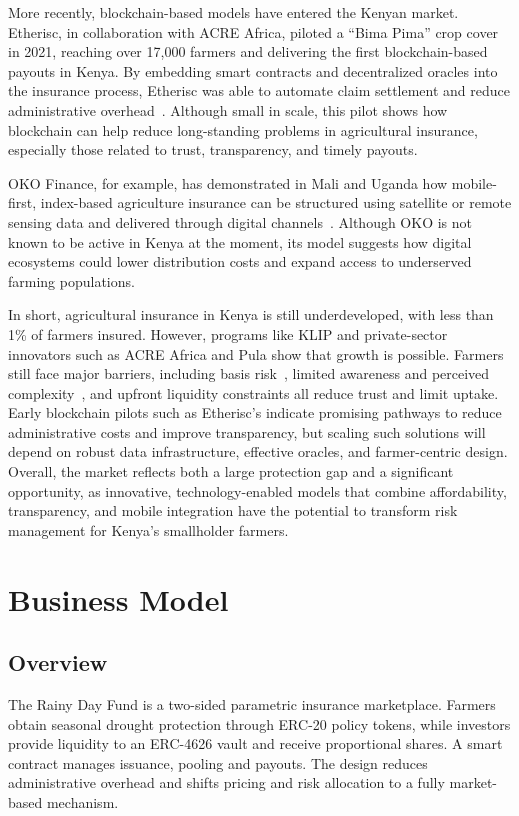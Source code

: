 \documentclass[11pt,a4paper]{article}
\begin{document}
		More recently, blockchain-based models have entered the Kenyan market.
		Etherisc, in collaboration with ACRE Africa, piloted a \enquote{Bima Pima} crop cover in 2021, reaching over 17,000 farmers and delivering the first blockchain-based payouts in Kenya.
		By embedding smart contracts and decentralized oracles into the insurance process, Etherisc was able to automate claim settlement and reduce administrative overhead~\parencite{Etherisc2021}.
		Although small in scale, this pilot shows how blockchain can help reduce long-standing problems in agricultural insurance, especially those related to trust, transparency, and timely payouts.

		OKO Finance, for example, has demonstrated in Mali and Uganda how mobile-first, index-based agriculture insurance can be structured using satellite or remote sensing data and delivered through digital channels~\parencite{ADA_OKOFinance2021}.
		Although OKO is not known to be active in Kenya at the moment, its model suggests how digital ecosystems could lower distribution costs and expand access to underserved farming populations.

		In short, agricultural insurance in Kenya is still underdeveloped, with less than 1\% of farmers insured.
		However, programs like KLIP and private-sector innovators such as ACRE Africa and Pula show that growth is possible.
		Farmers still face major barriers, including basis risk~\parencite{Jensen2016}, limited awareness and perceived complexity~\parencite{Janzen2020}, and upfront liquidity constraints all reduce trust and limit uptake.
		Early blockchain pilots such as Etherisc's indicate promising pathways to reduce administrative costs and improve transparency, but scaling such solutions will depend on robust data infrastructure, effective oracles, and farmer-centric design.
		Overall, the market reflects both a large protection gap and a significant opportunity, as innovative, technology-enabled models that combine affordability, transparency, and mobile integration have the potential to transform risk management for Kenya's smallholder farmers.

        \pagebreak

        \section{Business Model}\label{sec:business-model}

        \subsection{Overview}\label{subsec:overview}
        The Rainy Day Fund is a two-sided parametric insurance marketplace.
        Farmers obtain seasonal drought protection through ERC-20 policy tokens, while investors provide liquidity to an ERC-4626 vault and receive proportional shares.
        A smart contract manages issuance, pooling and payouts.
        The design reduces administrative overhead and shifts pricing and risk allocation to a fully market-based mechanism.
\end{document}
